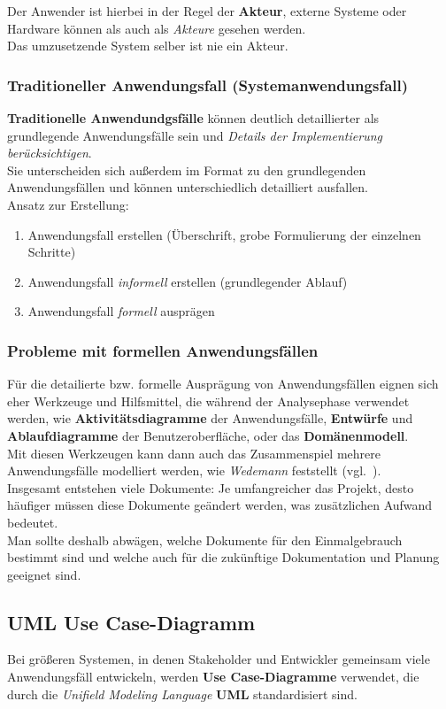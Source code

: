 \noindent
Der Anwender ist hierbei in der Regel der \textbf{Akteur}, externe Systeme oder Hardware können als auch als \textit{Akteure} gesehen werden.\\
Das umzusetzende System selber ist nie ein Akteur.

\subsubsection*{Traditioneller Anwendungsfall (Systemanwendungsfall)}
\textbf{Traditionelle Anwendundgsfälle} können deutlich detaillierter als grundlegende Anwendungsfälle sein und \textit{Details der Implementierung berücksichtigen}.\\
Sie unterscheiden sich außerdem im Format zu den grundlegenden Anwendungsfällen und können unterschiedlich detailliert ausfallen.\\

\noindent
Ansatz zur Erstellung:

\begin{enumerate}
    \item Anwendungsfall  erstellen (Überschrift, grobe Formulierung der einzelnen Schritte)
    \item Anwendungsfall \textit{informell} erstellen (grundlegender Ablauf)
    \item Anwendungsfall \textit{formell} ausprägen
\end{enumerate}


\subsubsection*{Probleme mit formellen Anwendungsfällen}
Für die detailierte bzw. formelle Ausprägung von Anwendungsfällen eignen sich eher Werkzeuge und Hilfsmittel, die während der Analysephase verwendet werden, wie \textbf{Aktivitätsdiagramme} der Anwendungsfälle, \textbf{Entwürfe} und \textbf{Ablaufdiagramme} der Benutzeroberfläche, oder das \textbf{Domänenmodell}.\\
Mit diesen Werkzeugen kann dann auch das Zusammenspiel mehrere Anwendungsfälle modelliert werden, wie \textit{Wedemann} feststellt (vgl.~\cite[71]{Wed09}).\\

\noindent
Insgesamt entstehen viele Dokumente: Je umfangreicher das Projekt, desto häufiger müssen diese Dokumente geändert werden, was zusätzlichen Aufwand bedeutet.\\
Man sollte deshalb abwägen, welche Dokumente für den Einmalgebrauch bestimmt sind und welche auch für die zukünftige Dokumentation und Planung geeignet sind.

\subsection*{UML Use Case-Diagramm}
Bei größeren Systemen, in denen Stakeholder und Entwickler gemeinsam viele Anwendungsfäll entwickeln, werden \textbf{Use Case-Diagramme} verwendet, die durch die \textit{Unifield Modeling Language} \textbf{UML} standardisiert sind.\\